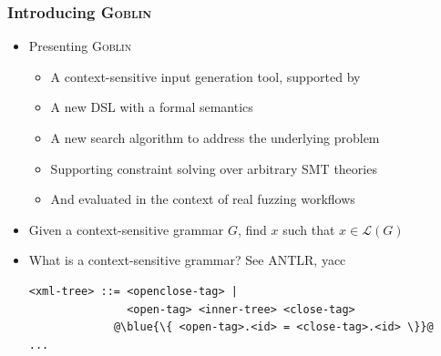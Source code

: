 \documentclass[11pt,xcolor={dvipsnames},hyperref={pdftex,pdfpagemode=UseNone,hidelinks,pdfdisplaydoctitle=true},usepdftitle=false]{beamer}
\newcommand{\system}{\textsc{Goblin}}
\newcommand{\green}[1]{\textcolor{green!60!black}{#1}}
\newcommand{\blue}[1]{\textcolor{blue!70!black}{#1}}
\begin{document}
\begin{frame}[fragile]
    \frametitle{Introducing \system{}} 
    \begin{itemize}
        \item Presenting \system{} \pause
        \begin{itemize}
        \item A \green{context-sensitive input generation tool}, supported by \pause
        \item A new \green{DSL} with a formal semantics \pause
        \item A new \green{search algorithm} to address the underlying problem \pause
        \item Supporting constraint solving over \green{arbitrary SMT theories} \pause
        \item And evaluated in the context of real fuzzing workflows \pause
        \end{itemize}
        \item Given a \green{context-sensitive grammar} \blue{$G$}, find \blue{$x$} such that \blue{$x \in \mathcal{L}(G)$} \pause
        \item What is a context-sensitive grammar? See ANTLR, yacc \pause
\begin{lstlisting}[style=goblin]
<xml-tree> ::= <openclose-tag> | 
               <open-tag> <inner-tree> <close-tag>
             @\blue{\{ <open-tag>.<id> = <close-tag>.<id> \}}@
... 
\end{lstlisting}
    \end{itemize}
\end{frame}
\end{document}

